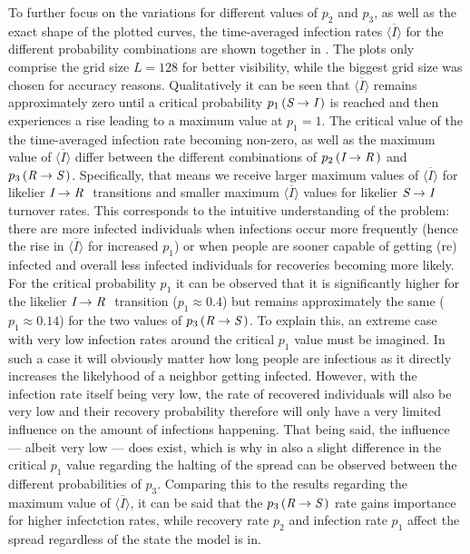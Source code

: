 To further focus on the variations for different values of $p_2$ and $p_3$, as well as the exact shape of the plotted curves, the time-averaged infection rates $\overline{\langle I\rangle}$ for the different probability 
combinations are shown together in . The plots only comprise the grid size $L=128$ for better visibility, while the biggest grid size was chosen for accuracy reasons. 
Qualitatively it can be seen that $\overline{\langle I\rangle}$ remains approximately zero until a critical probability $p_1\left(\textit{S}\rightarrow\textit{I}\,\right)$ is reached and then
experiences a rise leading to a maximum value at $p_1=1$. The critical value of the the time-averaged infection rate becoming non-zero, as well as the maximum value of $\overline{\langle I\rangle}$ 
differ between the different combinations of $p_2\left(\textit{I}\rightarrow\textit{R}\,\right)$ and $p_3\left(\textit{R}\rightarrow\textit{S}\,\right)$. Specifically, that means we receive larger maximum values
of $\overline{\langle I\rangle}$ for likelier $\textit{I}\rightarrow\textit{R}~$ transitions and smaller maximum $\overline{\langle I\rangle}$ values for likelier $\textit{S}\rightarrow\textit{I}~$
turnover rates. This corresponds to the intuitive understanding of the problem: there are more infected individuals when infections occur more frequently (hence the rise in $\overline{\langle I\rangle}$ for increased $p_1$) 
or when people are sooner capable of getting (re)\,infected and overall less infected individuals for recoveries becoming more likely. For the critical probability $p_1$ it can be observed that
it is significantly higher for the likelier $\textit{I}\rightarrow\textit{R}~$ transition ($p_1\approx 0.4$) but remains approximately the same ($p_1\approx 0.14$) for the two values of 
$p_3\left(\textit{R}\rightarrow\textit{S}\,\right)$. 
To explain this, an extreme case with very low infection rates around the critical $p_1$ value must be imagined. In such a case it will obviously matter how long people are infectious as it directly increases the likelyhood
of a neighbor getting infected. However, with the infection rate itself being very low, the rate of recovered individuals will also be very low and their recovery probability therefore will only have a very limited influence
on the amount of infections happening. That being said, the influence --- albeit very low --- does exist, which is why in  also a slight difference in the critical $p_1$ value
regarding the halting of the spread can be observed between the different probabilities of $p_3$.\newline
Comparing this to the results regarding the maximum value of $\overline{\langle I\rangle}$, it can be said that the $p_3\left(\textit{R}\rightarrow\textit{S}\,\right)$ rate 
gains importance for higher infectction rates, while recovery rate $p_2$ and infection rate $p_1$ affect the spread regardless of the state the model is in.


